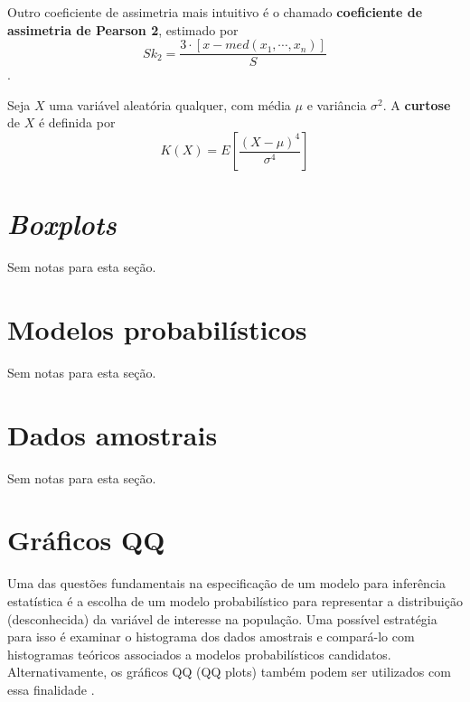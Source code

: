\documentclass[
]{latex/krantz}
\renewenvironment{quote}{\begin{VF}}{\end{VF}}
\theoremstyle{definition}
\theoremstyle{definition}
\theoremstyle{definition}
\theoremstyle{definition}
\theoremstyle{remark}
\begin{document}
\begin{quote}
Outro coeficiente de assimetria mais intuitivo é o chamado \textbf{coeficiente de assimetria de Pearson 2}, estimado por \[Sk_{2} = \frac{3 \cdot [ x - med(x_{1}, \cdots, x_{n})]}{S}\] \citep[p.~51]{MorettinSinger2022}.
\end{quote}

\begin{quote}
Seja \(X\) uma variável aleatória qualquer, com média \(\mu\) e variância \(\sigma^{2}\). A \textbf{curtose} de \(X\) é definida por \[K(X) = E \left[ \frac{(X - \mu)^{4}}{\sigma^{4}} \right]\] \citep[p.~53]{MorettinSinger2022}
\end{quote}

\hypertarget{boxplots}{%
\section{\texorpdfstring{\emph{Boxplots}}{Boxplots}}\label{boxplots}}

Sem notas para esta seção.

\hypertarget{modelos-probabiluxedsticos}{%
\section{Modelos probabilísticos}\label{modelos-probabiluxedsticos}}

Sem notas para esta seção.

\hypertarget{dados-amostrais}{%
\section{Dados amostrais}\label{dados-amostrais}}

Sem notas para esta seção.

\hypertarget{gruxe1ficos-qq}{%
\section{Gráficos QQ}\label{gruxe1ficos-qq}}

\begin{quote}
Uma das questões fundamentais na especificação de um modelo para inferência estatística é a escolha de um modelo probabilístico para representar a distribuição (desconhecida) da variável de interesse na população. Uma possível estratégia para isso é examinar o histograma dos dados amostrais e compará-lo com histogramas teóricos associados a modelos probabilísticos candidatos. Alternativamente, os gráficos QQ (QQ plots) também podem ser utilizados com essa finalidade \citep[p.~59]{MorettinSinger2022}.
\end{quote}
\end{document}
